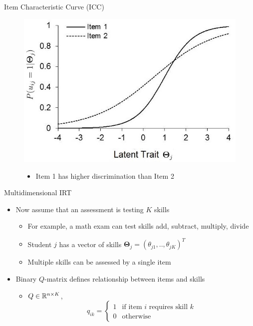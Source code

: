 \documentclass{beamer}
\def \R{\ensuremath \mathbb{R}}
\newcommand{\vect}[1]{\boldsymbol{#1}}
\theoremstyle{definition}
\begin{document}
\begin{frame}{Item Characteristic Curve (ICC)}
\begin{figure}
  \centering
  \includegraphics[width=.7\textwidth]{../img/logistic_2param_icc.jpg}
  \begin{itemize}
    \item Item 1 has higher discrimination than Item 2
  \end{itemize}
\end{figure}

\end{frame}
\begin{frame}{Multidimensional IRT}
\begin{itemize}
  \item Now assume that an assessment is testing $K$ skills
  \begin{itemize}
    \item For example, a math exam can test skills add, subtract, multiply, divide
    \item Student $j$ has a vector of skills $\vect \Theta_j = (\theta_{j1},.., \theta_{jK})^T$
    \item Multiple skills can be assessed by a single item
  \end{itemize}
  \item<2-> Binary $Q$-matrix defines relationship between items and skills
  \begin{itemize}
    \item<2-> $Q \in \R^{n \times K}$, \[q_{ik} = \begin{cases}
    1 & \text{if item } i \text{ requires skill } k \\ 
    0 & \text{otherwise} 
    \end{cases}\]
  \end{itemize}
\end{itemize}
\end{frame}
\end{document}
